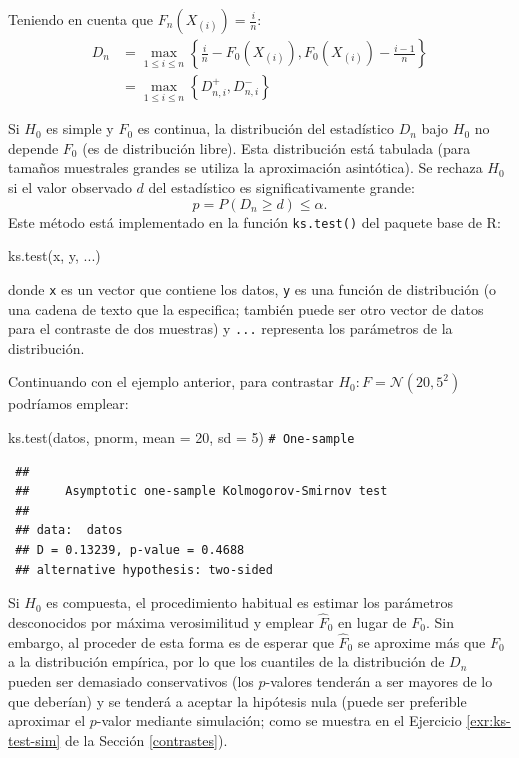 \documentclass[
]{book}
\newenvironment{Shaded}{\begin{snugshade}}{\end{snugshade}}
\newcommand{\AttributeTok}[1]{\textcolor[rgb]{0.77,0.63,0.00}{#1}}
\newcommand{\CommentTok}[1]{\textcolor[rgb]{0.56,0.35,0.01}{\textit{#1}}}
\newcommand{\DecValTok}[1]{\textcolor[rgb]{0.00,0.00,0.81}{#1}}
\newcommand{\FunctionTok}[1]{\textcolor[rgb]{0.00,0.00,0.00}{#1}}
\newcommand{\NormalTok}[1]{#1}
\theoremstyle{break}
\theoremstyle{nonumberplain}
\renewcommand{\CommentTok}[1]{\textcolor[rgb]{0.41,0.41,0.41}{\texttt{#1}}}
\begin{document}
Teniendo en cuenta que \(F_n\left( X_{(i)}\right) = \frac{i}n\):
\[\begin{aligned}
D_n  & =\max_{1\leq i\leq n}\left \{  \frac{i}n-F_0(X_{(i)}),F_0(X_{(i)})-\frac{i-1}n\right \} \\
& =\max_{1\leq i\leq n}\left \{  D_{n,i}^{+},D_{n,i}^{-}\right \}
\end{aligned}\]

Si \(H_0\) es simple y \(F_0\) es continua, la distribución del estadístico \(D_n\) bajo \(H_0\) no depende \(F_0\) (es de distribución libre).
Esta distribución está tabulada (para tamaños muestrales grandes se utiliza la aproximación asintótica).
Se rechaza \(H_0\) si el valor observado \(d\) del estadístico es significativamente grande:
\[p = P \left( D_n \geq d \right) \leq \alpha.\]
Este método está implementado en la función \texttt{ks.test()} del paquete base de R:

\begin{Shaded}
\begin{Highlighting}[]
\FunctionTok{ks.test}\NormalTok{(x, y, ...)}
\end{Highlighting}
\end{Shaded}

donde \texttt{x} es un vector que contiene los datos, \texttt{y} es una función de distribución
(o una cadena de texto que la especifica; también puede ser otro vector de datos
para el contraste de dos muestras) y \texttt{...} representa los parámetros de la distribución.

Continuando con el ejemplo anterior, para contrastar \(H_0:F= \mathcal{N}(20,5^2)\) podríamos emplear:

\begin{Shaded}
\begin{Highlighting}[]
\FunctionTok{ks.test}\NormalTok{(datos, pnorm, }\AttributeTok{mean =} \DecValTok{20}\NormalTok{, }\AttributeTok{sd =} \DecValTok{5}\NormalTok{) }\CommentTok{\# One{-}sample }
\end{Highlighting}
\end{Shaded}

\begin{verbatim}
 ## 
 ##     Asymptotic one-sample Kolmogorov-Smirnov test
 ## 
 ## data:  datos
 ## D = 0.13239, p-value = 0.4688
 ## alternative hypothesis: two-sided
\end{verbatim}

Si \(H_0\) es compuesta, el procedimiento habitual es estimar los parámetros desconocidos
por máxima verosimilitud y emplear \(\hat{F}_0\) en lugar de \(F_0\).
Sin embargo, al proceder de esta forma es de esperar que \(\hat{F}_0\) se aproxime más
que \(F_0\) a la distribución empírica, por lo que los cuantiles de la distribución de
\(D_n\) pueden ser demasiado conservativos (los \(p\)-valores tenderán a ser mayores de
lo que deberían) y se tenderá a aceptar la hipótesis nula (puede ser preferible aproximar el \(p\)-valor mediante simulación; como se muestra en el Ejercicio \ref{exr:ks-test-sim} de la Sección \ref{contrastes}).
\end{document}
